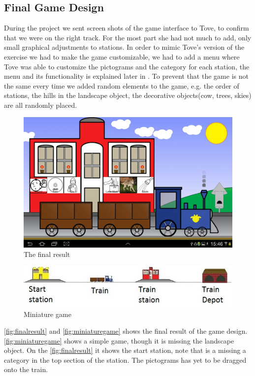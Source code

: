 \subsection{Final Game Design}
\label{sec:designgameinterface}
During the project we sent screen shots of the game interface to Tove, to confirm that we were on the right track. For the most part she had not much to add, only small graphical adjustments to stations. 
In order to mimic Tove's version of the exercise we had to make the game customizable, we had to add a menu where Tove was able to customize the pictograms and the category for each station, the menu and its functionality is explained later in . To prevent that the game is not the same every time we added random elements to the game, e.g. the order of stations, the hills in the landscape object, the decorative objects(cow, trees, skies) are all randomly placed. 
\begin{figure}[H]
\centering
\includegraphics[width=0.9\linewidth]{img/screenshots/gamedesign1.jpg}%
\caption{The final result}
\label{fig:finalresult}
\end{figure}
\begin{figure}[H]
\centering
\includegraphics[width=0.9\linewidth]{img/screenshots/stations.jpg}%
\caption{Miniature game}
\label{fig:miniaturegame}
\end{figure}
\autoref{fig:finalresult} and \autoref{fig:miniaturegame} shows the final result of the game design. \autoref{fig:miniaturegame} shows a simple game, though it is missing the landscape object. On the \autoref{fig:finalresult} it shows the start station, note that is a missing a category in the top section of the station. The pictograms has yet to be dragged onto the train. 
